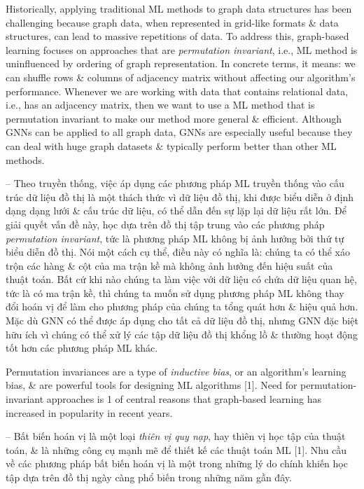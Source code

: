 \documentclass{article}
\begin{document}
\begin{itemize}
\begin{itemize}
\begin{itemize}
            Historically, applying traditional ML methods to graph data structures has been challenging because graph data, when represented in grid-like formats \& data structures, can lead to massive repetitions of data. To address this, graph-based learning focuses on approaches that are {\it permutation invariant}, i.e., ML method is uninfluenced by ordering of graph representation. In concrete terms, it means: we can shuffle rows \& columns of adjacency matrix without affecting our algorithm's performance. Whenever we are working with data that contains relational data, i.e., has an adjacency matrix, then we want to use a ML method that is permutation invariant to make our method more general \& efficient. Although GNNs can be applied to all graph data, GNNs are especially useful because they can deal with huge graph datasets \& typically perform better than other ML methods.

            -- Theo truyền thống, việc áp dụng các phương pháp ML truyền thống vào cấu trúc dữ liệu đồ thị là một thách thức vì dữ liệu đồ thị, khi được biểu diễn ở định dạng dạng lưới \& cấu trúc dữ liệu, có thể dẫn đến sự lặp lại dữ liệu rất lớn. Để giải quyết vấn đề này, học dựa trên đồ thị tập trung vào các phương pháp {\it permutation invariant}, tức là phương pháp ML không bị ảnh hưởng bởi thứ tự biểu diễn đồ thị. Nói một cách cụ thể, điều này có nghĩa là: chúng ta có thể xáo trộn các hàng \& cột của ma trận kề mà không ảnh hưởng đến hiệu suất của thuật toán. Bất cứ khi nào chúng ta làm việc với dữ liệu có chứa dữ liệu quan hệ, tức là có ma trận kề, thì chúng ta muốn sử dụng phương pháp ML không thay đổi hoán vị để làm cho phương pháp của chúng ta tổng quát hơn \& hiệu quả hơn. Mặc dù GNN có thể được áp dụng cho tất cả dữ liệu đồ thị, nhưng GNN đặc biệt hữu ích vì chúng có thể xử lý các tập dữ liệu đồ thị khổng lồ \& thường hoạt động tốt hơn các phương pháp ML khác.

            Permutation invariances are a type of {\it inductive bias}, or an algorithm's learning bias, \& are powerful tools for designing ML algorithms [1]. Need for permutation-invariant approaches is 1 of central reasons that graph-based learning has increased in popularity in recent years.

            -- Bất biến hoán vị là một loại {\it thiên vị quy nạp}, hay thiên vị học tập của thuật toán, \& là những công cụ mạnh mẽ để thiết kế các thuật toán ML [1]. Nhu cầu về các phương pháp bất biến hoán vị là một trong những lý do chính khiến học tập dựa trên đồ thị ngày càng phổ biến trong những năm gần đây.


\end{itemize}
\end{itemize}
\end{itemize}
\end{document}
